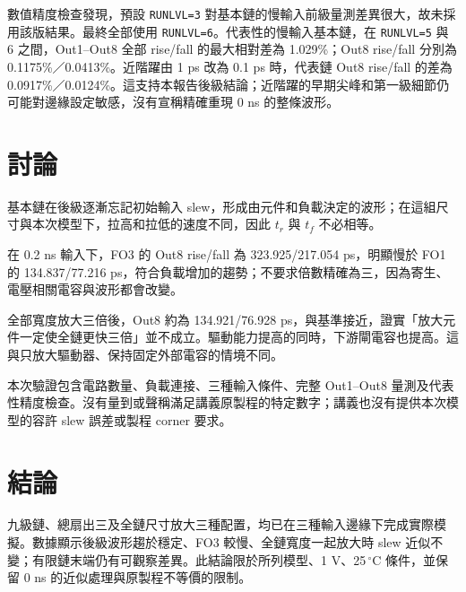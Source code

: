 數值精度檢查發現，預設 \texttt{RUNLVL=3} 對基本鏈的慢輸入前級量測差異很大，故未採用該版結果。最終全部使用 \texttt{RUNLVL=6}。代表性的慢輸入基本鏈，在 \texttt{RUNLVL=5} 與 6 之間，Out1--Out8 全部 rise/fall 的最大相對差為 1.029\%；Out8 rise/fall 分別為 0.1175\%／0.0413\%。近階躍由 1 ps 改為 0.1 ps 時，代表鏈 Out8 rise/fall 的差為 0.0917\%／0.0124\%。這支持本報告後級結論；近階躍的早期尖峰和第一級細節仍可能對邊緣設定敏感，沒有宣稱精確重現 0 ns 的整條波形。

\section{討論}
基本鏈在後級逐漸忘記初始輸入 slew，形成由元件和負載決定的波形；在這組尺寸與本次模型下，拉高和拉低的速度不同，因此 $t_r$ 與 $t_f$ 不必相等。

在 0.2 ns 輸入下，FO3 的 Out8 rise/fall 為 323.925/217.054 ps，明顯慢於 FO1 的 134.837/77.216 ps，符合負載增加的趨勢；不要求倍數精確為三，因為寄生、電壓相關電容與波形都會改變。

全部寬度放大三倍後，Out8 約為 134.921/76.928 ps，與基準接近，證實「放大元件一定使全鏈更快三倍」並不成立。驅動能力提高的同時，下游閘電容也提高。這與只放大驅動器、保持固定外部電容的情境不同。

本次驗證包含電路數量、負載連接、三種輸入條件、完整 Out1--Out8 量測及代表性精度檢查。沒有量到或聲稱滿足講義原製程的特定數字；講義也沒有提供本次模型的容許 slew 誤差或製程 corner 要求。

\section{結論}
九級鏈、總扇出三及全鏈尺寸放大三種配置，均已在三種輸入邊緣下完成實際模擬。數據顯示後級波形趨於穩定、FO3 較慢、全鏈寬度一起放大時 slew 近似不變；有限鏈末端仍有可觀察差異。此結論限於所列模型、1 V、25\,$^\circ$C 條件，並保留 0 ns 的近似處理與原製程不等價的限制。
